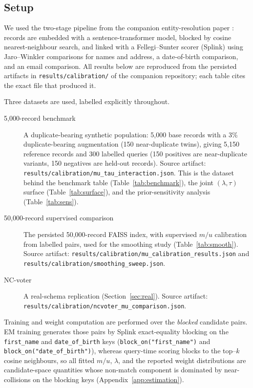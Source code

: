 \documentclass[11pt]{article}
\begin{document}
\subsection{Setup}
We used the two-stage pipeline from the companion entity-resolution paper
\cite{pipeline}: records are embedded with a
sentence-transformer model, blocked by cosine nearest-neighbour search, and linked with a
Fellegi--Sunter scorer (Splink) \cite{splink} using Jaro--Winkler comparisons for names and address, a
date-of-birth comparison, and an email comparison. All results below are reproduced from
the persisted artifacts in \texttt{results/calibration/} of the companion repository; each
table cites the exact file that produced it.

Three datasets are used, labelled explicitly throughout.

\begin{description}
\item[5{,}000-record benchmark] A duplicate-bearing synthetic population: 5{,}000 base
records with a 3\% duplicate-bearing augmentation (150 near-duplicate twins), giving
5{,}150 reference records and 300 labelled queries (150 positives are near-duplicate
variants, 150 negatives are held-out records). Source artifact:
\texttt{results/calibration/mu\_tau\_interaction.json}. This is the dataset behind the
benchmark table (Table~\ref{tab:benchmark}), the joint $(\lambda,\tau)$ surface
(Table~\ref{tab:surface}), and the prior-sensitivity analysis
(Table~\ref{tab:sens}).
\item[50{,}000-record supervised comparison] The persisted 50{,}000-record FAISS index,
with supervised $m/u$ calibration from labelled pairs, used for the smoothing study
(Table~\ref{tab:smooth}). Source artifact:
\texttt{results/calibration/mu\_calibration\_results.json} and
\texttt{results/calibration/smoothing\_sweep.json}.
\item[NC-voter] A real-schema replication (Section~\ref{sec:real}). Source artifact:
\texttt{results/calibration/ncvoter\_mu\_comparison.json}.
\end{description}

Training and weight computation are performed over the \emph{blocked} candidate
pairs. EM training generates those pairs by Splink exact-equality blocking on the
\texttt{first\_name} and \texttt{date\_of\_birth} keys
(\texttt{block\_on("first\_name")} and \texttt{block\_on("date\_of\_birth")}), whereas
query-time scoring blocks to the top--$k$ cosine neighbours, so all fitted $m/u$, $\lambda$,
and the reported weight distributions are candidate-space quantities whose non-match
component is dominated by near-collisions on the blocking keys
(Appendix~\ref{app:estimation}).
\end{document}
